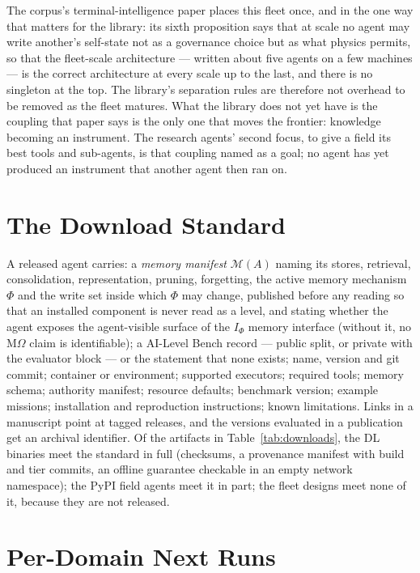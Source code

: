 \documentclass[11pt]{article}
\theoremstyle{definition}
\begin{document}
The corpus's terminal-intelligence paper places this fleet once, and in the one way that matters for the library: its sixth proposition says that at scale no agent may write another's self-state not as a governance choice but as what physics permits, so that the fleet-scale architecture --- written about five agents on a few machines --- is the correct architecture at every scale up to the last, and there is no singleton at the top. The library's separation rules are therefore not overhead to be removed as the fleet matures. What the library does not yet have is the coupling that paper says is the only one that moves the frontier: knowledge becoming an instrument. The research agents' second focus, to give a field its best tools and sub-agents, is that coupling named as a goal; no agent has yet produced an instrument that another agent then ran on.

\section{The Download Standard}\label{sec:standard}

A released agent carries: a \emph{memory manifest} $\mathcal M(A)$ naming its stores, retrieval, consolidation, representation, pruning, forgetting, the active memory mechanism $\Phi$ and the write set inside which $\Phi$ may change, published before any reading so that an installed component is never read as a level, and stating whether the agent exposes the agent-visible surface of the $I_\Phi$ memory interface (without it, no M$\Omega$ claim is identifiable); a AI-Level Bench record --- public split, or private with the evaluator block --- or the statement that none exists; name, version and git commit; container or environment; supported executors; required tools; memory schema; authority manifest; resource defaults; benchmark version; example missions; installation and reproduction instructions; known limitations. Links in a manuscript point at tagged releases, and the versions evaluated in a publication get an archival identifier. Of the artifacts in Table~\ref{tab:downloads}, the DL binaries meet the standard in full (checksums, a provenance manifest with build and tier commits, an offline guarantee checkable in an empty network namespace); the PyPI field agents meet it in part; the fleet designs meet none of it, because they are not released.

\section{Per-Domain Next Runs}\label{sec:next}
\end{document}
